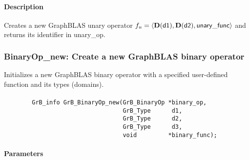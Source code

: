 \paragraph{Description}

Creates a new GraphBLAS unary operator $f_u = \langle \bold{D}({\sf d1}), 
\bold{D}({\sf d2}), {\sf unary\_func} \rangle$ and returns its identifier 
in {\sf unary\_op}.



\subsubsection{{\sf BinaryOp\_new}: Create a new GraphBLAS binary operator}

Initializes a new GraphBLAS binary operator with a specified user-defined 
function and its types (domains).

\paragraph{\syntax}

\begin{verbatim}
        GrB_info GrB_BinaryOp_new(GrB_BinaryOp *binary_op,
                                  GrB_Type      d1,
                                  GrB_Type      d2,
                                  GrB_Type      d3,
                                  void         *binary_func);
\end{verbatim}

\paragraph{Parameters}

